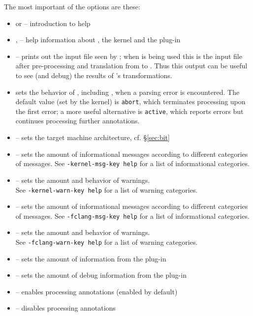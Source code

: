 The most important of the options are these:
\begin{itemize}
\item {}  or  -- introduction to \framac help
    \item {},  -- help information about \fc, the \fc kernel and the \fcl plug-in
    \item {} -- prints out the input file seen by \fc; when \fcl is being used this is the input file after pre-processing and translation from \cpp to \C. Thus this output can be useful to see (and debug) the results of \fcl's transformations.
    \item {} sets the behavior of \framac, including \fclang, when a parsing error is encountered. The default value (set by the kernel) is \texttt{abort}, which terminates processing upon the first error; a more useful alternative is \texttt{active}, which reports errors but continues processing further annotations.
	\item {} -- sets the target machine architecture, cf. \S\ref{sec:bit}
	\item {} -- sets the amount of informational messages according to different categories of messages.
See \lstinline|-kernel-msg-key help| for a list of informational categories.
	\item {} -- sets the amount and behavior of warnings.\\ See \lstinline|-kernel-warn-key help| for a list of warning categories.
	\item {} -- sets the amount of informational messages according to different categories of messages.
See \lstinline|-fclang-msg-key help| for a list of informational categories.
	\item {} -- sets the amount and behavior of warnings.\\ See \lstinline|-fclang-warn-key help| for a list of warning categories.
	\item {} -- sets the amount of information from the \fclang plug-in
	\item {} -- sets the amount of debug information from the \fclang plug-in
	\item {} -- enables processing \acslpp annotations (enabled by default)
	\item {} -- disables processing \acslpp annotations
\end{itemize}

